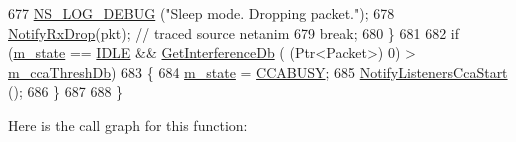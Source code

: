 \begin{DoxyCode}
677       \hyperlink{group__logging_ga413f1886406d49f59a6a0a89b77b4d0a}{NS\_LOG\_DEBUG} (\textcolor{stringliteral}{"Sleep mode. Dropping packet."});
678       \hyperlink{classns3_1_1UanPhy_a5bb13228bb14707309af61666412968e}{NotifyRxDrop}(pkt);    \textcolor{comment}{// traced source netanim}
679       \textcolor{keywordflow}{break};
680     \}
681 
682   \textcolor{keywordflow}{if} (\hyperlink{classns3_1_1UanPhyGen_a7c0bda9705a7f5f602707dde48497670}{m\_state} == \hyperlink{classns3_1_1UanPhy_afc5e3b6b00589131e4a56ececd42bf9fa6143a554e834f71f498e5f781682d347}{IDLE} && \hyperlink{classns3_1_1UanPhyGen_a8c991401463b00f7daaf3c3486f6bf1b}{GetInterferenceDb} ( (Ptr<Packet>) 0) > 
      \hyperlink{classns3_1_1UanPhyGen_a72db86114a294c5c5678eabbbdc996f9}{m\_ccaThreshDb})
683     \{
684       \hyperlink{classns3_1_1UanPhyGen_a7c0bda9705a7f5f602707dde48497670}{m\_state} = \hyperlink{classns3_1_1UanPhy_afc5e3b6b00589131e4a56ececd42bf9fae78813f125a9e8f989861c489a798f46}{CCABUSY};
685       \hyperlink{classns3_1_1UanPhyGen_a8f5614c856c43db7cf91a83e9e8506e9}{NotifyListenersCcaStart} ();
686     \}
687 
688 \}
\end{DoxyCode}


Here is the call graph for this function\+:


